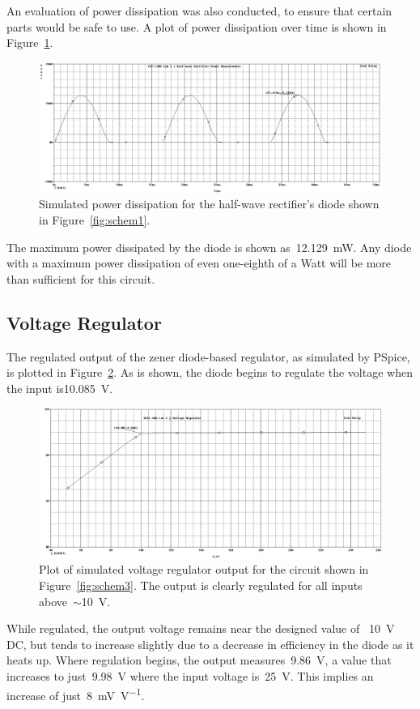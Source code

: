 An evaluation of power dissipation was also conducted, to ensure that certain
parts would be safe to use.  A plot of power dissipation over time is shown in
Figure~\ref{fig:halfwavePlotW}.
%
\begin{figure}[H]
	\centering
	\includegraphics[width=\pwidth]{img/plot/halfwavePowerPlot.PNG}
	\parbox{\pwidth}{
	\caption[PSpice Plot --- Half-wave Rectifier (Power)]{Simulated power
		dissipation for the half-wave rectifier's diode shown in
		Figure~\ref{fig:schem1}.}
	\label{fig:halfwavePlotW}}
\end{figure}
%
The maximum power dissipated by the diode is shown as~\SI{12.129}{\milli\watt}.
Any diode with a maximum power dissipation of even one-eighth of a Watt will be
more than sufficient for this circuit.

\subsection{Voltage Regulator}
The regulated output of the zener diode-based regulator, as simulated by
PSpice, is plotted in Figure~\ref{fig:zenerPlotV}.  As is shown, the diode
begins to regulate the voltage when the input is\SI{10.085}{\volt}.
%
\begin{figure}[H]
	\centering
	\includegraphics[width=\pwidth]{img/plot/zenerPlot.PNG}
	\parbox{\pwidth}{
	\caption[PSpice Plot --- Voltage Regulator (Voltage)]{Plot of simulated
	voltage regulator output for the circuit shown in Figure~\ref{fig:schem3}.
	The output is clearly regulated for all inputs above~$\sim$\SI{10}{\volt}.}
	\label{fig:zenerPlotV}}
\end{figure}
%
While regulated, the output voltage remains near the designed value of
~\SI{10}{\volt} DC, but tends to increase slightly due to a decrease in
efficiency in the diode as it heats up.  Where regulation begins, the output
measures~\SI{9.86}{\volt}, a value that increases to just~\SI{9.98}{\volt}
where the input voltage is~\SI{25}{\volt}.  This implies an increase of
just~\SI{8}{\milli\volt\per\volt}.

